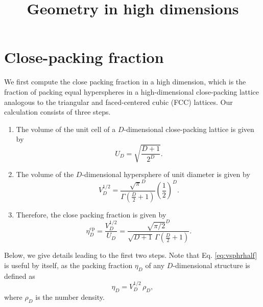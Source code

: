 \documentclass{article}
\begin{document}
\title{Geometry in high dimensions}
\author{}
\date{\vspace{-10ex}}
\maketitle


\section{Close-packing fraction}

We first compute the close packing fraction
in a high dimension,
which is the fraction of packing equal hyperspheres
in a high-dimensional close-packing lattice analogous to
the triangular and faced-centered cubic (FCC) lattices.
%
Our calculation consists of three steps.

\begin{enumerate}
\item
The volume of the unit cell of a $D$-dimensional
close-packing lattice is given by
\begin{equation}
  U_D
  =
  \sqrt{ \frac{ D + 1 }
              {  2^D  } }.
  \label{eq:vunitcell}
\end{equation}

\item
The volume of the $D$-dimensional hypersphere
of unit diameter is given by
\begin{equation}
  V^{1/2}_D
  =
  \frac{     { \sqrt \pi }^D      }
       {  \Gamma(\frac D 2 + 1 )  }
  \left( \frac{ 1 } { 2 } \right)^D
  .
  \label{eq:vsphrhalf}
\end{equation}

\item
Therefore, the close packing fraction is given by
\begin{equation}
  \eta^\mathrm{cp}_D
  =
  \frac{ V_D^{1/2} }
       { U_D       }
  =
  \frac{ \sqrt{ \pi / 2 }^D }
       { \sqrt{ D + 1 } \,
         \Gamma\left( \frac D 2 + 1 \right) }
  .
  \label{eq:packfrac}
\end{equation}

\end{enumerate}

Below, we give details leading to the first two steps. 
%
Note that Eq. \eqref{eq:vsphrhalf} is useful by itself,
as the packing fraction $\eta_D$
of any $D$-dimensional structure is defined as
$$
\eta_D = V^{1/2}_D \, \rho_D,
$$
where $\rho_D$ is the number density.
\end{document}
